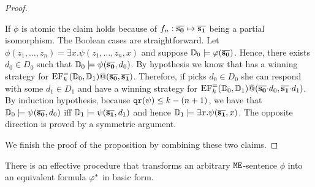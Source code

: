 \begin{proof}
\begin{pfclaim}
If $\phi$ is atomic the claim holds because of $f_n:\overline{{\mathbf{s_0}}}\mapsto 
\overline{{\mathbf{s_1}}}$ being a partial isomorphism. 
The Boolean cases are straightforward.
Let $\phi(z_1,\dots,z_n) = \exists x. \psi(z_1,\dots,z_n,x)$ and suppose
$\mathbb{D}_0 \models \varphi(\overline{{\mathbf{s_0}}})$. 
Hence, there exists $d_0 \in D_0$ such that $\mathbb{D}_0 \models 
\psi(\overline{{\mathbf{s_0}}},d_0)$.
By hypothesis we know that \eloise has a winning strategy for 
$\mathrm{EF}_k^=(\mathbb{D}_0,\mathbb{D}_1)@(\overline{{\mathbf{s_0}}},\overline{{\mathbf{s_1}}})$. 
Therefore, if \abelard picks $d_0\in D_0$ she can respond with some $d_1\in D_1$ 
and have a winning strategy for 
$\efgame_{k}^=(\osmodel_0,\osmodel_1)%
@(\vlist{s_0}{\cdot}d_0,\vlist{s_1}{\cdot}d_1)$.
By induction hypothesis, because $\mathtt{qr}(\psi) \leq k- (n+1)$, we have that 
$\mathbb{D}_0 \models \psi(\overline{{\mathbf{s_0}}},d_0)$ iff $\mathbb{D}_1 \models 
\psi(\overline{{\mathbf{s_1}}},d_1)$ and hence 
$\mathbb{D}_1 \models \exists x.\psi(\overline{{\mathbf{s_1}}},x)$. 
The opposite direction is proved by a symmetric argument. 
\end{pfclaim}

\noindent
We finish the proof of the proposition by combining these two claims.
\end{proof}

\begin{theorem}
\label{thm:bnfofoe}
There is an effective procedure that transforms an arbitrary $\mathtt{M}\mathtt{E}$-sentence 
$\phi$ into an equivalent formula $\varphi^{*}$ in basic form.
\end{theorem}

